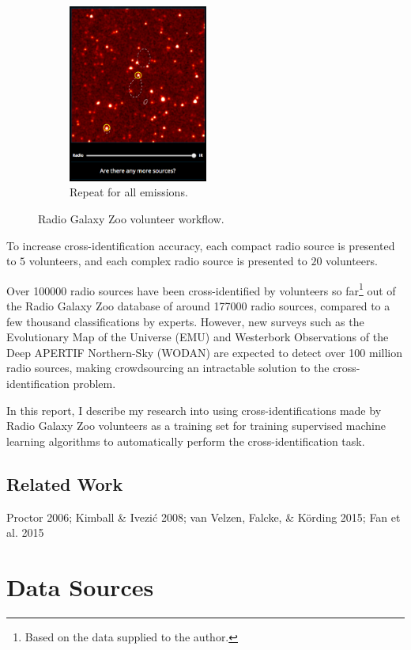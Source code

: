 \documentclass[a4paper]{article}
\begin{document}
\begin{figure}[!ht]
\begin{subfigure}{0.3\textwidth}
            \includegraphics[width=\linewidth, height=2.3in]{images/rgz_done.png}
            \caption{Repeat for all emissions.}
          \end{subfigure}
          \caption{Radio Galaxy Zoo volunteer workflow.}
          \label{fig:rgz}
      \end{figure}

      To increase cross-identification accuracy, each compact radio source is presented to $5$ volunteers, and each complex radio source is presented to $20$ volunteers\cite{banfield15}.

      Over 100000 radio sources have been cross-identified by volunteers so far\footnote{Based on the data supplied to the author.} out of the Radio Galaxy Zoo database of around 177000 radio sources, compared to a few thousand classifications by experts\cite{banfield15}. However, new surveys such as the Evolutionary Map of the Universe (EMU) \cite{norris11} and Westerbork Observations of the Deep APERTIF Northern-Sky (WODAN) \cite{röttgering11} are expected to detect over 100 million radio sources\cite{banfield15}, making crowdsourcing an intractable solution to the cross-identification problem.

      In this report, I describe my research into using cross-identifications made by Radio Galaxy Zoo volunteers as a training set for training supervised machine learning algorithms to automatically perform the cross-identification task.

    \subsection{Related Work}

      Proctor 2006\cite{proctor06}; Kimball \& Ivezić 2008; van Velzen, Falcke, \& Körding 2015; Fan et al. 2015\cite{fan15}

  \section{Data Sources}
\end{document}
